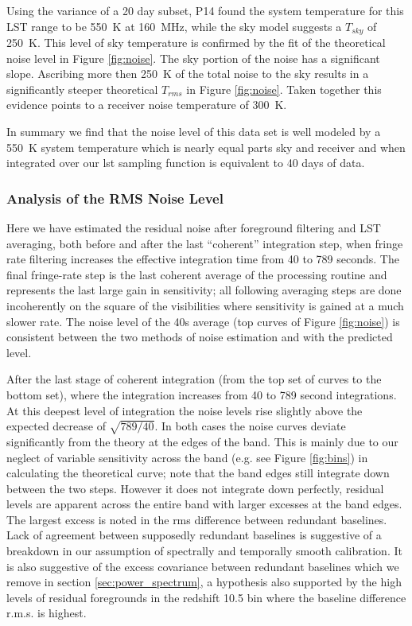 \documentclass[preprint2]{aastex}
\begin{document}
Using the variance of a 20 day subset, P14 found the system temperature for this LST range to be 550~K at 160~MHz, while the sky model suggests a $T_{sky}$ of 250~K.  This level of sky temperature is confirmed by the fit of the theoretical noise level in Figure \ref{fig:noise}.   The sky portion of the noise has a significant slope. Ascribing more then 250~K of the total noise to the sky results in a significantly steeper theoretical $T_{rms}$ in Figure \ref{fig:noise}. Taken together this evidence points to a receiver noise temperature of 300~K. 

In summary we find that the noise level of this data set is well modeled by a 550~K system temperature which is nearly equal parts sky and receiver and when integrated over our lst sampling function is equivalent to 40 days of data.

\subsubsection{Analysis of the RMS Noise Level}

Here we have estimated the residual noise after foreground filtering and LST averaging, both before and after the last ``coherent'' integration step, when fringe rate filtering increases the effective integration time from 40 to 789 seconds.  
The final fringe-rate step is the last coherent average of the processing routine and represents the last large gain in sensitivity; all following averaging steps are done incoherently on the square of the visibilities where sensitivity is gained at a much slower rate.  The noise level of the 40s average (top curves of Figure \ref{fig:noise}) is consistent between the two methods of noise estimation and with the predicted level. 

After the last stage of coherent integration (from the top set of curves to the bottom set), where the integration increases from 40 to 789 second integrations.  At this deepest level of integration the noise levels rise slightly above the expected decrease of $\sqrt{789/40}$. In both cases the noise curves deviate significantly from the theory at the edges of the band. This is mainly due to our neglect of variable sensitivity across the band (e.g. see Figure \ref{fig:bins}) in calculating the theoretical curve; note that the band edges still integrate down between the two steps. However it does not integrate down perfectly, residual levels are apparent across the entire band with larger excesses at the band edges.  The largest excess is noted in the rms difference between redundant baselines.  Lack of agreement between supposedly redundant baselines is suggestive of a breakdown in our assumption of spectrally and temporally smooth calibration. It is also suggestive of the excess covariance between redundant baselines which we remove in section \ref{sec:power_spectrum}, a hypothesis also supported by the high levels of residual foregrounds in the redshift 10.5 bin where the baseline difference r.m.s. is highest.
\end{document}
